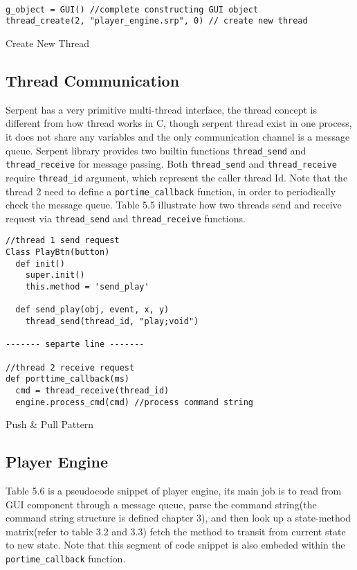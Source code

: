\begin{table}[htdp]
\centering

\begin{lstlisting}

g_object = GUI() //complete constructing GUI object
thread_create(2, "player_engine.srp", 0) // create new thread

\end{lstlisting}

\caption[Create New Thread]{Create New Thread}
\end{table}

\subsection{Thread Communication}

Serpent has a very primitive multi-thread interface, the thread concept is 
different from how thread works in C, though serpent 
thread exist in one process, it does not share any variables and the only 
communication channel is a message queue. Serpent library provides two
builtin functions \texttt{thread\_send} and \texttt{thread\_receive} 
for message passing. Both \texttt{thread\_send} and \texttt{thread\_receive}
require \texttt{thread\_id} argument, which represent the caller thread Id. 
Note that the thread 2 need to define a \texttt{portime\_callback} function, 
in order to periodically check the message queue. Table 5.5 illustrate how 
two threads send and receive request via \texttt{thread\_send} and 
\texttt{thread\_receive} functions.
\begin{table}[htdp]
\centering
\begin{lstlisting}
//thread 1 send request 
Class PlayBtn(button)
  def init()
    super.init()
    this.method = 'send_play'

  def send_play(obj, event, x, y)
    thread_send(thread_id, "play;void")

------- separte line -------

//thread 2 receive request 
def porttime_callback(ms)
  cmd = thread_receive(thread_id)
  engine.process_cmd(cmd) //process command string
\end{lstlisting}
\caption[Push \& Pull Pattern]{Push \& Pull Pattern}
\end{table}

\subsection{Player Engine}
Table 5.6 is a pseudocode snippet of player engine, its main job is to read from  
GUI component through a message queue, parse the command string(the  
command string structure is defined chapter 3), and then look up a state-method 
matrix(refer to table 3.2 and 3.3) fetch the method to transit from current 
state to new state. Note that this segment of code snippet is also embeded 
within the \texttt{portime\_callback} function.



